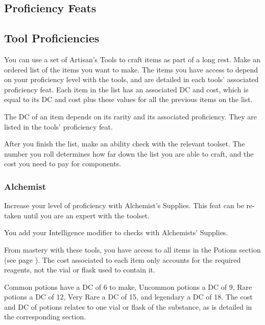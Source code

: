 \subsection*{Proficiency Feats}

\subsection*{Tool Proficiencies}
You can use a set of Artisan's Tools to craft items as part of a long rest.
Make an ordered list of the items you want to make.
The items you have access to depend on your proficiency level with the tools, and are detailed in each tools' associated proficiency feat.
Each item in the list has an associated DC and cost, which is equal to its DC and cost plus these values for all the previous items on the list.

The DC of an item depends on its rarity and its associated proficiency.
They are listed in the tools' proficiency feat.

After you finish the list, make an ability check with the relevant toolset.
The number you roll determines how far down the list you are able to craft, and the cost you need to pay for components.

\subsubsection{Alchemist} \label{feat::alchemist}
    Increase your level of proficiency with Alchemist's Supplies.
    This feat can be re-taken until you are an expert with the toolset.

    You add your Intelligence modifier to checks with Alchemists' Supplies.

    From mastery with these tools, you have access to all items in the Potions section (see page \pageref{ssec::potions}).
    The cost associated to each item only accounts for the required reagents, not the vial or flask used to contain it.

    Common potions have a DC of 6 to make, Uncommon potions a DC of 9, Rare potions a DC of 12, Very Rare a DC of 15, and legendary a DC of 18.
    The cost and DC of potions relates to one vial or flask of the substance, as is detailed in the corresponding section.
